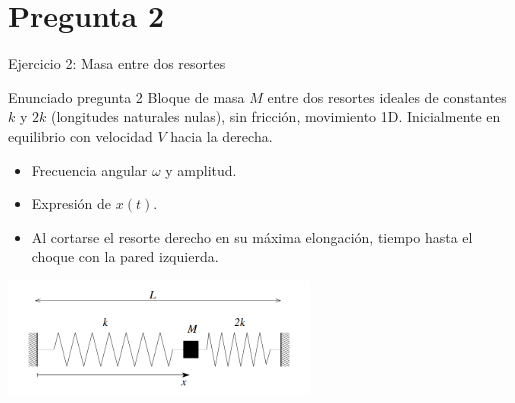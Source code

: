 \documentclass[
    10pt,
    aspectratio=169,
    xcolor={dvipsnames},
    spanish,
    ]{beamer}
\begin{document}
\section{Pregunta 2}
\begin{frame}{Ejercicio 2: Masa entre dos resortes}
  \begin{block}{Enunciado pregunta 2}
    Bloque de masa $M$ entre dos resortes ideales de constantes $k$ y $2k$ (longitudes naturales nulas), sin fricción, movimiento 1D. Inicialmente en equilibrio con velocidad $V$ hacia la derecha.
    \begin{itemize}
      \item Frecuencia angular $\omega$ y amplitud.
      \item Expresión de $x(t)$.
      \item Al cortarse el resorte derecho en su máxima elongación, tiempo hasta el choque con la pared izquierda.
    \end{itemize}
  \end{block}
  \vspace{2pt}
  \centering
  \includegraphics[width=0.6\textwidth]{Auxiliar_1_2 copy.png}
\end{frame}
\end{document}
